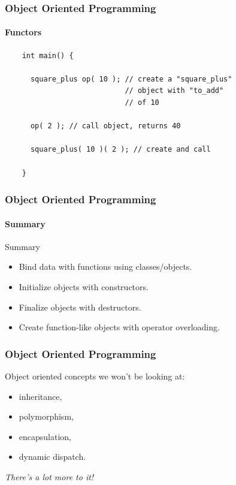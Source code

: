 \documentclass{beamer}
\begin{document}
\begin{frame}[fragile]
  \frametitle{Object Oriented Programming}
  \framesubtitle{Functors}
  \begin{example}
    \begin{lstlisting}
    int main() {

      square_plus op( 10 ); // create a "square_plus"
                            // object with "to_add"
                            // of 10

      op( 2 ); // call object, returns 40

      square_plus( 10 )( 2 ); // create and call

    }
    \end{lstlisting}
  \end{example}
\end{frame}

\begin{frame}
  \frametitle{Object Oriented Programming}
  \framesubtitle{Summary}
  \begin{block}{Summary}
  \begin{itemize}
    \item Bind data with functions using classes/objects.
    \item Initialize objects with constructors.
    \item Finalize objects with destructors.
    \item Create function-like objects with operator overloading.
  \end{itemize}
  \end{block}
\end{frame}

\begin{frame}[fragile]
  \frametitle{Object Oriented Programming}
  Object oriented concepts we won't be looking at:
  \begin{itemize}
    \item inheritance,
    \item polymorphism,
    \item encapsulation,
    \item dynamic dispatch.
  \end{itemize}
  \vspace{.5cm}
  \emph{There's a lot more to it!}
\end{frame}



\end{document}

